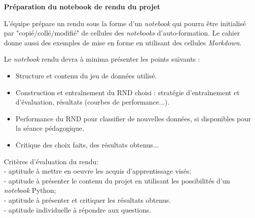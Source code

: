 \documentclass[11pt,french]{article}
\newcommand{\VDB}[1]{\VeryDarkBlue{#1}}
\newcommand{\file}[1]{{\ttfamily \VDB{#1}}}
\begin{document}
\begin {bclogo}[noborder=true, couleurBarre=Chocolate, logo=\bctrombone]{}
  \vspace*{-4mm}\textbf{Préparation du notebook de rendu du projet}

L'équipe prépare un rendu sous la forme d'un {\em notebook} qui pourra être initialisé par "copié/collé/modifié" de cellules des {\em notebooks} d'auto-formation.
Le cahier \file{template.ipynb} donne aussi des exemples de mise en forme en utilisant des cellules {\em Markdown}.

Le {\em notebook} rendu devra à minima présenter les points suivants :
\begin{itemize}
\item Structure et contenu du jeu de données utilisé.
\item Construction et entraînement du RND choisi : stratégie d'entraînement et d'évaluation, résultats (courbes de performance...).
\item Performance du RND pour classifier de nouvelles données, si disponibles pour la séance pédagogique.
\item Critique des choix faits, des résultats obtenus...
\end{itemize}
\end{bclogo}  
%
\vspace*{-2mm}
\bigskip
Critères d'évaluation du rendu: \\
- aptitude à mettre en oeuvre les acquis d'apprentissage visés;\\
- aptitude à présenter le contenu du projet en utilisant les possibilités d'un {\em notebook} Python;\\
- aptitude à présenter et critiquer les résultats obtenus.\\
- aptitude individuelle à répondre aux questions.\\
\end{document}
